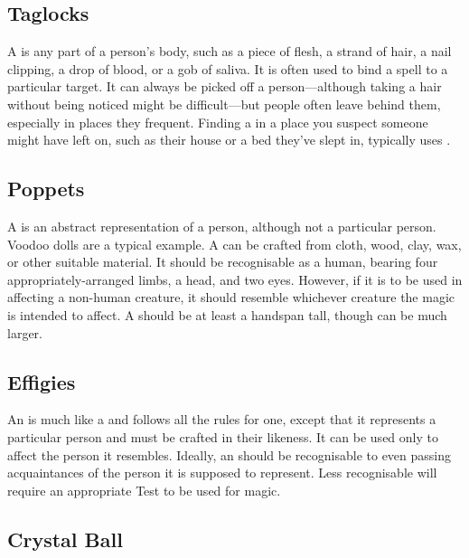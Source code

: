 \subsection{Taglocks}

A  is any part of a person's body, such as a piece of flesh, a strand of hair, a nail clipping, a drop of blood, or a gob of saliva.
It is often used to bind a spell to a particular target.
It can always be picked off a person---although taking a hair without being noticed might be difficult---but people often leave  behind them, especially in places they frequent.
Finding a  in a place you suspect someone might have left on, such as their house or a bed they've slept in, typically uses .

\subsection{Poppets}

A  is an abstract representation of a person, although not a particular person.
Voodoo dolls are a typical example.
A  can be crafted from cloth, wood, clay, wax, or other suitable material.
It should be recognisable as a human, bearing four appropriately-arranged limbs, a head, and two eyes.
However, if it is to be used in  affecting a non-human creature, it should resemble whichever creature the magic is intended to affect.
A  should be at least a handspan tall, though can be much larger.

\subsection{Effigies}

An  is much like a  and follows all the rules for one, except that it represents a particular person and must be crafted in their likeness.
It can be used only to affect the person it resembles.
Ideally, an  should be recognisable to even passing acquaintances of the person it is supposed to represent.
Less recognisable  will require an appropriate Test to be used for magic.

\subsection{Crystal Ball}

